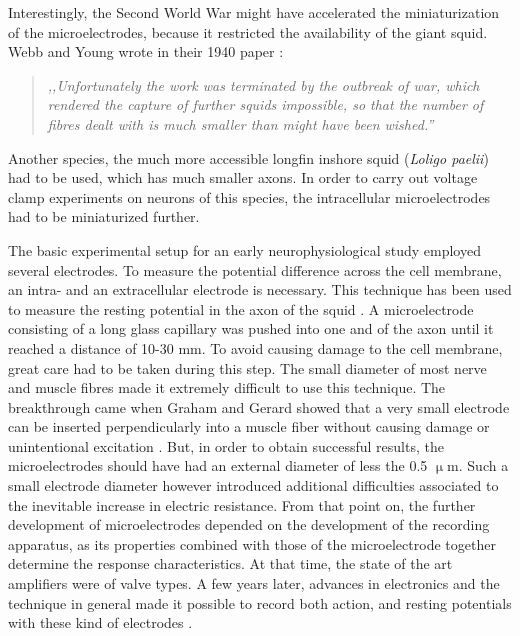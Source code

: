 Interestingly, the Second World War might have accelerated the miniaturization of the microelectrodes, because it restricted the availability of the giant squid.
Webb and Young wrote in their 1940 paper \cite{webb1940electrolyte}:

\begin{quote}
\vspace{0.5cm}
\emph{,,Unfortunately the work was terminated by the outbreak of war, which rendered the capture of further squids impossible, so that the number of fibres dealt with is much smaller than might have been wished.''}
\vspace{0.5cm}
\end{quote} 

Another species, the much more accessible longfin inshore squid (\emph{Loligo paelii}) had to be used, which has much smaller axons.
In order to carry out voltage clamp experiments on neurons of this species, the intracellular microelectrodes had to be miniaturized further.

The basic experimental setup for an early neurophysiological study employed several electrodes.
To measure the potential difference across the cell membrane, an intra- and an extracellular electrode is necessary.
This technique has been used to measure the resting potential in the axon of the squid \cite{curtis1940membrane, curtis1942membrane}.
A microelectrode consisting of a long glass capillary was pushed into one and of the axon until it reached a distance of 10-30 mm.
To avoid causing damage to the cell membrane, great care had to be taken during this step.
The small diameter of most nerve and muscle fibres made it extremely difficult to use this technique.
The breakthrough came when Graham and Gerard showed that a very small electrode can be inserted perpendicularly into a muscle fiber without causing damage or unintentional excitation \cite{graham1946judith, ling1949normal}.
But, in order to obtain successful results, the microelectrodes should have had an external diameter of less the 0.5 $\upmu$m.
Such a small electrode diameter however introduced additional difficulties associated to the inevitable increase in electric resistance.
From that point on, the further development of microelectrodes depended on the development of the recording apparatus, as its properties combined with those of the microelectrode together determine the response characteristics.
At that time, the state of the art amplifiers were of valve types.
A few years later, advances in electronics and the technique in general made it possible to record both action, and resting potentials with these kind of electrodes \cite{hodgkin1949membrane, nastuk1950electrical}.

